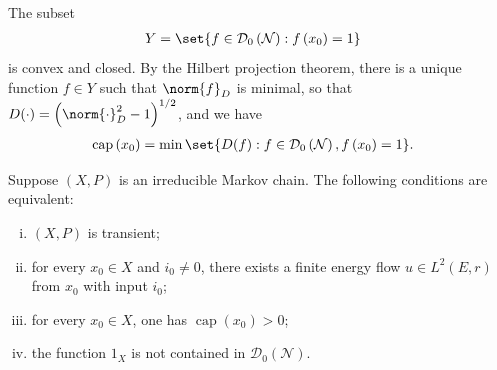 \documentclass[10pt]{mypackage}
\begin{document}
The subset
\begin{align*}
  Y &= \set{f\in \mathcal{D}_0\left( \mathcal{N} \right) : f\left( x_0 \right) = 1}
\end{align*}
is convex and closed. By the Hilbert projection theorem, there is a unique function $f\in Y$ such that $\norm{f}_{D}$ is minimal, so that $D(\cdot) = \left( \norm{\cdot}_D^2 - 1 \right)^{1/2}$, and we have
\begin{align*}
  \operatorname{cap}\left( x_0 \right) &= \min\set{D(f) : f\in \mathcal{D}_0\left( \mathcal{N} \right), f\left( x_0 \right) = 1}.
\end{align*}
\begin{theorem}
  Suppose $\left( X,P \right)$ is an irreducible Markov chain. The following conditions are equivalent:
  \begin{enumerate}[(i)]
    \item $\left( X,P \right)$ is transient;
    \item for every $x_0\in X$ and $i_0\neq 0$, there exists a finite energy flow $u\in L^2\left( E,r \right)$ from $x_0$ with input $i_0$;
    \item for every $x_0\in X$, one has $\operatorname{cap}\left( x_0 \right) > 0$;
    \item the function $1_X$ is not contained in $\mathcal{D}_0\left( \mathcal{N} \right)$.
  \end{enumerate}
\end{theorem}
\end{document}

